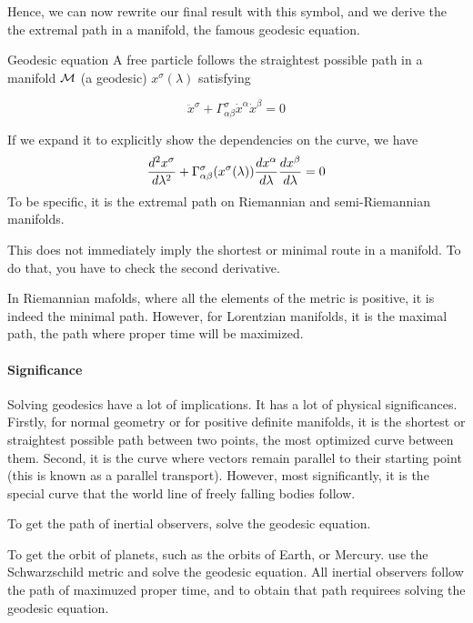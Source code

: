 	Hence, we can now rewrite our final result with this symbol, and 
	we derive the the extremal path
	in a manifold, the famous geodesic equation.

	\begin{theorem}{Geodesic equation}
		A free particle follows
		the straightest possible path in a manifold $\mathcal{M}$ 
		(a geodesic) $x^\sigma(\lambda)$ satisfying

		\begin{equation}
			\label{eq:geodesic-eqn}
			\ddot{x}^\sigma
			+
			\Gamma^{\sigma}_{\alpha\beta}
			\dot{x}^\alpha 
			\dot{x}^\beta 
			=
			0
		\end{equation}
	\end{theorem}

	If we expand it to explicitly show the dependencies on the 
	curve, we have
	\begin{equation}
		\label{eq:geodesic-eqn-explicit}
		\dv[2]{x^\sigma}{\lambda} 
		+ 
		\Gamma^\sigma_{\alpha\beta}(x^\sigma(\lambda)) 
		\dv{x^\alpha}{\lambda} 
		\dv{x^\beta}{\lambda} 
		=
		0
	\end{equation}
	To be specific, it is the extremal path on Riemannian 
	and semi-Riemannian manifolds.

	This does not immediately imply the shortest or minimal route
	in a manifold. To do that, you have to check the second derivative.

	In Riemannian mafolds, where all the elements of the metric is positive,
	it is indeed the minimal path. 
	However, for Lorentzian manifolds, it is the maximal path, the path 
	where proper time will be maximized.

	\paragraph{Significance}

	Solving geodesics have a lot of implications. It 
	has a lot of physical significances. Firstly, 
	for normal geometry or for positive definite manifolds, 
	it is the shortest or straightest 
	possible path between two points, the most optimized
	curve between them. Second, it is the curve where
	vectors remain parallel to their starting point (this is known
	as a parallel transport).
	However, most significantly, it is the special curve
	that the world line of freely falling bodies follow.

	To get the path of inertial observers, solve the geodesic equation.

	To get the orbit of planets, such as the orbits of Earth, or Mercury.
	use the Schwarzschild metric and solve the geodesic equation.
	All inertial observers follow the path of maximuzed proper time,
	and to obtain that path requirees solving the geodesic equation.

